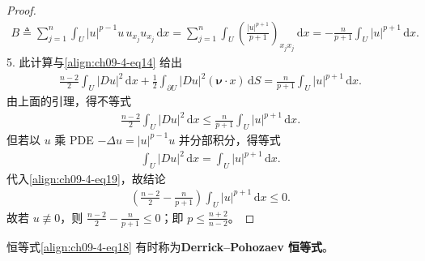 \documentclass[../../main.tex]{subfiles}
\begin{document}
\begin{theorem}[非平凡解的不存在性]
\begin{proof}
\begin{align*}
B\triangleq\sum_{j=1}^n\int_U|u|^{p-1}u\,u_{x_j}u_{x_j}\,\mathrm{d}x=\sum_{j=1}^n\int_U\left(\frac{|u|^{p+1}}{p+1}\right)_{x_jx_j}\,\mathrm{d}x=-\frac{n}{p+1}\int_U|u|^{p+1}\,\mathrm{d}x.
\end{align*}
5. 此计算与\eqref{align:ch09-4-eq14} 给出
\begin{align}
\frac{n-2}{2}\int_U|Du|^2\,\mathrm{d}x+\frac12\int_{\partial U}|Du|^2(\boldsymbol{\nu}\cdot x)\,\mathrm{d}S=\frac{n}{p+1}\int_U|u|^{p+1}\,\mathrm{d}x.\label{align:ch09-4-eq18}
\end{align}
由上面的引理，得不等式
\begin{align}
\frac{n-2}{2}\int_U|Du|^2\,\mathrm{d}x\leqslant\frac{n}{p+1}\int_U|u|^{p+1}\,\mathrm{d}x.\label{align:ch09-4-eq19}
\end{align}
但若以 $u$ 乘 PDE $-\Delta u=|u|^{p-1}u$ 并分部积分，得等式
\begin{align*}
\int_U|Du|^2\,\mathrm{d}x=\int_U|u|^{p+1}\,\mathrm{d}x.
\end{align*}
代入\eqref{align:ch09-4-eq19}，故结论
\begin{align*}
\left(\frac{n-2}{2}-\frac{n}{p+1}\right)\int_U|u|^{p+1}\,\mathrm{d}x\leqslant 0.
\end{align*}
故若 $u\not\equiv 0$，则 $\frac{n-2}{2}-\frac{n}{p+1}\leqslant 0$；即 $p\leqslant\frac{n+2}{n-2}$。
\end{proof}
\end{theorem}

恒等式\eqref{align:ch09-4-eq18} 有时称为\textbf{Derrick--Pohozaev 恒等式}。
\end{document}
